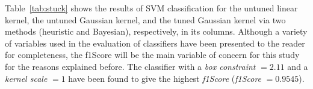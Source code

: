 





Table~\ref{tab:stuck} shows the results of SVM classification for the untuned linear kernel, the untuned Gaussian kernel, and the tuned Gaussian kernel via two methods (heuristic and Bayesian), respectively, in its columns.  
Although a variety of variables used in the evaluation of classifiers have been presented to the reader for completeness, the f1Score will be the main variable of concern for this study for the reasons explained before. 
The classifier with a \emph{box constraint} $= 2.11$ and a \emph{kernel scale} $ = 1$ have been found to give the highest \emph{f1Score} (\emph{f1Score} $= 0.9545$). 

